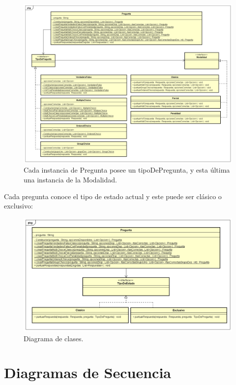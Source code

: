 \documentclass[titlepage,a4paper]{article}
\begin{document}
\begin{figure}[H]
\centering
\includegraphics[width=1\textwidth]{img/UMLClases3.png}
\caption{\label{fig:class01}Cada instancia de Pregunta posee un tipoDePregunta, y esta última una instancia de la Modalidad.}
\end{figure}

\newpage
Cada pregunta conoce el tipo de estado actual y este puede ser clásico o exclusivo:

\begin{figure}[H]
\centering
\includegraphics[width=1\textwidth]{img/UMLClases4.png}
\caption{\label{fig:class01}Diagrama de clases.}
\end{figure}

\newpage
\section{Diagramas de Secuencia}
\end{document}

